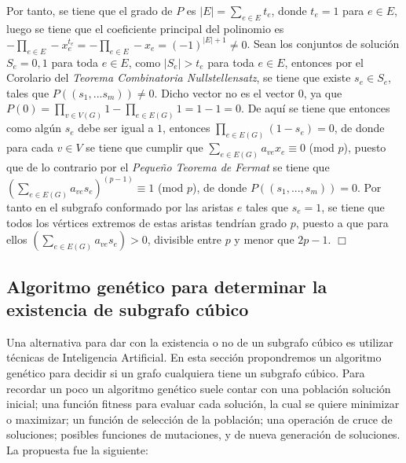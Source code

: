 \documentclass{article}
\begin{document}
Por tanto, se tiene que el grado de $P$ es $|E| = \sum_{e \in E} t_e$, donde $t_e = 1$ para $e \in E$, luego se tiene que el 
coeficiente principal del polinomio es $- \prod_{e \in E}  - x_e^{t_e} = - \prod_{e \in E} - x_e = (-1)^{|E| + 1} \neq 0$. Sean los 
conjuntos de soluci\'on $S_e = {0,1}$ para toda $e \in E$, como $|S_e| > t_e$ para toda $e \in E$, entonces por el Corolario del \textit{Teorema Combinatoria Nullstellensatz}, se tiene 
que existe $s_e \in S_e$, tales que $P((s_1,...s_m))  \neq 0$. Dicho vector no es el vector $0$, ya que $P(0) = \prod_{v \in V(G)}  1 - \prod_{e \in E(G)} 1 = 1 - 1 = 0$. De aquí se tiene que entonces 
como alg\'un $s_e$ debe ser igual a $1$, entonces $\prod_{e \in E(G)} (1 - s_e) = 0$, de donde para cada $v \in V$ se tiene que cumplir que 
$\sum_{e \in E(G)} a_{ve} x_e \equiv 0$ (mod $p$), puesto que de lo contrario por el \textit{Peque\~no Teorema de Fermat} se tiene que $(\sum_{e \in E(G)} a_{ve} s_e)^(p-1) \equiv 1$ (mod $p$), de donde 
$P((s_1,...,s_m)) = 0 $. Por tanto en el subgrafo conformado por las aristas $e$ tales que $s_e = 1$, se tiene que todos los v\'ertices extremos de estas aristas tendr\'ian grado $p$, puesto a que para ellos
$(\sum_{e \in E(G)} a_{ve} s_e) > 0$, divisible entre $p$ y menor que $2p-1$. $\Box $


\subsection*{Algoritmo gen\'etico para determinar la existencia de subgrafo c\'ubico}

Una alternativa para dar con la existencia o no de un subgrafo cúbico es utilizar técnicas de Inteligencia Artificial. En esta sección propondremos un algoritmo genético para decidir si un grafo cualquiera tiene un subgrafo cúbico. Para recordar un poco un algoritmo genético suele contar con una población solución inicial; una función fitness para evaluar cada solución, la cual se quiere minimizar o maximizar; un función de selección de la población; una operación de cruce de soluciones; posibles funciones de mutaciones, y de nueva generación de soluciones. La propuesta fue la siguiente:
\end{document}
